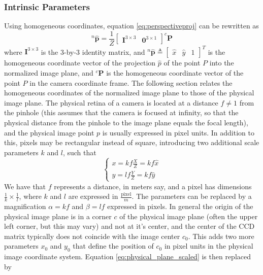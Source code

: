 \subsubsection{Intrinsic Parameters}
Using homogeneous coordinates, equation \ref{eq:perspectiveproj} can be rewritten as
\begin{equation}
\label{eq:homo}
^n\mathbf{\hat{p}}=\frac{1}{Z}\begin{bmatrix}\mathbf{I}^{3\times3} & \mathbf{0}^{3\times1}\end{bmatrix}^c\mathbf{P}
\end{equation}
where $\mathbf{I}^{3\times3}$ is the 3-by-3 identity matrix, and $^n\mathbf{\hat{p}}\triangleq \begin{bmatrix}\hat{x}&\hat{y}&1\end{bmatrix}^T$ is the homogeneous coordinate vector of the projection $\hat{p}$ of the point $P$ into the normalized image plane, and $^c\mathbf{P}$ is the homogeneous coordinate vector of the point $P$ in the camera coordinate frame. The following section relates the homogeneous coordinates of the normalized image plane to those of the physical image plane. The physical retina of a camera is located at a distance $f\neq1$ from the pinhole (this assumes that the camera is focused at infinity, so that the physical distance from the pinhole to the image plane equals the focal length), and the physical image point $p$ is usually expressed in pixel units. In addition to this, pixels may be rectangular instead of square, introducing two additional scale parameters $k$ and $l$, such that
\begin{equation}
\label{eq:physical_plane_scaled}
    \begin{cases}
    x=kf\frac{X}{Z}=kf\hat{x}\\
    y=lf\frac{Y}{Z}=kf\hat{y}
    \end{cases}
\end{equation}
We have that $f$ represents a distance, in meters say, and a pixel has dimensions $\frac{1}{k}\times\frac{1}{l}$, where $k$ and $l$ are expressed in $\frac{\text{pixel}}{m}$. The parameters can be replaced by a magnification $\alpha=kf$ and $\beta=lf$ expressed in pixels. In general the origin of the physical image plane is in a corner $c$ of the physical image plane (often the upper left corner, but this may vary) and not at it's center, and the center of the CCD matrix typically does not coincide with the image center $c_0$. This adds two more parameters $x_0$ and $y_0$ that define the position of $c_0$ in pixel units in the physical image coordinate system. Equation \ref{eq:physical_plane_scaled} is then replaced by

